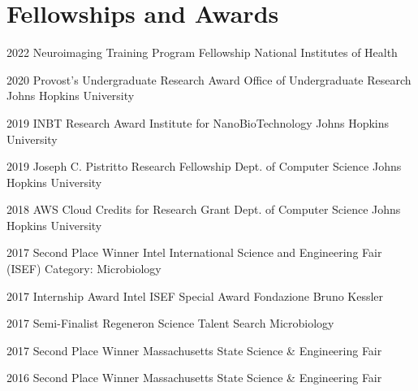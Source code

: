 \section{Fellowships and Awards}

\cventry
{2022}
{Neuroimaging Training Program Fellowship}
{}
{National Institutes of Health}
{}
{}

\cventry
{2020}
{Provost's Undergraduate Research Award}
{Office of Undergraduate Research}
{Johns Hopkins University}
{}
{}

\cventry
{2019}
{INBT Research Award}
{Institute for NanoBioTechnology}
{Johns Hopkins University}
{}
{}%

\cventry
{2019}
{Joseph C. Pistritto Research Fellowship}
{Dept. of Computer Science}
{Johns Hopkins University}
{}
{}%

\cventry
{2018}
{AWS Cloud Credits for Research Grant}
{Dept. of Computer Science}
{Johns Hopkins University}
{}
{} %

\cventry
{2017}
{Second Place Winner}
{Intel International Science and Engineering Fair (ISEF)}
{Category: Microbiology}
{}
{} %

\cventry
{2017}
{Internship Award}
{Intel ISEF Special Award}
{Fondazione Bruno Kessler}
{}
{} %

\cventry
{2017}
{Semi-Finalist}
{Regeneron Science Talent Search}
{Microbiology}
{}
{} %

\cventry
{2017}
{Second Place Winner}
{Massachusetts State Science \& Engineering Fair}
{}
{}
{} %

\cventry
{2016}
{Second Place Winner}
{Massachusetts State Science \& Engineering Fair}
{}
{}
{} %